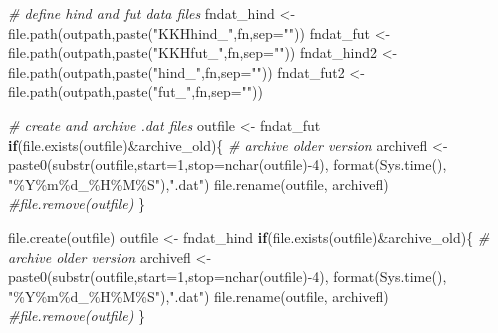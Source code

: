 \documentclass[
]{article}
\newenvironment{Shaded}{\begin{snugshade}}{\end{snugshade}}
\newcommand{\AttributeTok}[1]{\textcolor[rgb]{0.77,0.63,0.00}{#1}}
\newcommand{\CommentTok}[1]{\textcolor[rgb]{0.56,0.35,0.01}{\textit{#1}}}
\newcommand{\ControlFlowTok}[1]{\textcolor[rgb]{0.13,0.29,0.53}{\textbf{#1}}}
\newcommand{\DecValTok}[1]{\textcolor[rgb]{0.00,0.00,0.81}{#1}}
\newcommand{\FunctionTok}[1]{\textcolor[rgb]{0.00,0.00,0.00}{#1}}
\newcommand{\NormalTok}[1]{#1}
\newcommand{\OtherTok}[1]{\textcolor[rgb]{0.56,0.35,0.01}{#1}}
\newcommand{\SpecialCharTok}[1]{\textcolor[rgb]{0.00,0.00,0.00}{#1}}
\newcommand{\StringTok}[1]{\textcolor[rgb]{0.31,0.60,0.02}{#1}}
\begin{document}
\begin{Shaded}
\begin{Highlighting}[]
  \CommentTok{\# define hind and fut data files}
\NormalTok{    fndat\_hind  }\OtherTok{\textless{}{-}} \FunctionTok{file.path}\NormalTok{(outpath,}\FunctionTok{paste}\NormalTok{(}\StringTok{"KKHhind\_"}\NormalTok{,fn,}\AttributeTok{sep=}\StringTok{""}\NormalTok{))}
\NormalTok{    fndat\_fut   }\OtherTok{\textless{}{-}} \FunctionTok{file.path}\NormalTok{(outpath,}\FunctionTok{paste}\NormalTok{(}\StringTok{"KKHfut\_"}\NormalTok{,fn,}\AttributeTok{sep=}\StringTok{""}\NormalTok{))}
\NormalTok{    fndat\_hind2 }\OtherTok{\textless{}{-}} \FunctionTok{file.path}\NormalTok{(outpath,}\FunctionTok{paste}\NormalTok{(}\StringTok{"hind\_"}\NormalTok{,fn,}\AttributeTok{sep=}\StringTok{""}\NormalTok{))}
\NormalTok{    fndat\_fut2  }\OtherTok{\textless{}{-}} \FunctionTok{file.path}\NormalTok{(outpath,}\FunctionTok{paste}\NormalTok{(}\StringTok{"fut\_"}\NormalTok{,fn,}\AttributeTok{sep=}\StringTok{""}\NormalTok{))}
    
    \CommentTok{\# create and archive .dat files}
\NormalTok{      outfile    }\OtherTok{\textless{}{-}}\NormalTok{ fndat\_fut}
    \ControlFlowTok{if}\NormalTok{(}\FunctionTok{file.exists}\NormalTok{(outfile)}\SpecialCharTok{\&}\NormalTok{archive\_old)\{   }
        \CommentTok{\# archive older version}
\NormalTok{            archivefl }\OtherTok{\textless{}{-}} \FunctionTok{paste0}\NormalTok{(}\FunctionTok{substr}\NormalTok{(outfile,}\AttributeTok{start=}\DecValTok{1}\NormalTok{,}\AttributeTok{stop=}\FunctionTok{nchar}\NormalTok{(outfile)}\SpecialCharTok{{-}}\DecValTok{4}\NormalTok{),}
                            \FunctionTok{format}\NormalTok{(}\FunctionTok{Sys.time}\NormalTok{(), }\StringTok{"\%Y\%m\%d\_\%H\%M\%S"}\NormalTok{),}\StringTok{".dat"}\NormalTok{)}
            \FunctionTok{file.rename}\NormalTok{(outfile, archivefl)}
            \CommentTok{\#file.remove(outfile)}
\NormalTok{    \}}
    
    \FunctionTok{file.create}\NormalTok{(outfile)}
\NormalTok{    outfile  }\OtherTok{\textless{}{-}}\NormalTok{ fndat\_hind}
    \ControlFlowTok{if}\NormalTok{(}\FunctionTok{file.exists}\NormalTok{(outfile)}\SpecialCharTok{\&}\NormalTok{archive\_old)\{   }
        \CommentTok{\# archive older version}
\NormalTok{            archivefl }\OtherTok{\textless{}{-}} \FunctionTok{paste0}\NormalTok{(}\FunctionTok{substr}\NormalTok{(outfile,}\AttributeTok{start=}\DecValTok{1}\NormalTok{,}\AttributeTok{stop=}\FunctionTok{nchar}\NormalTok{(outfile)}\SpecialCharTok{{-}}\DecValTok{4}\NormalTok{),}
                            \FunctionTok{format}\NormalTok{(}\FunctionTok{Sys.time}\NormalTok{(), }\StringTok{"\%Y\%m\%d\_\%H\%M\%S"}\NormalTok{),}\StringTok{".dat"}\NormalTok{)}
            \FunctionTok{file.rename}\NormalTok{(outfile, archivefl)}
            \CommentTok{\#file.remove(outfile)}
\NormalTok{    \}}
    

\end{Highlighting}
\end{Shaded}
\end{document}
